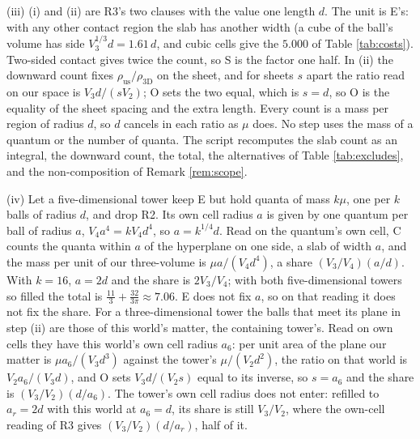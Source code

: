 (iii) (i) and (ii) are R3's two clauses with the value one length $d$. The unit is E's: with any other contact region the slab has another width (a cube of the ball's volume has side $V_{3}^{1/3}d = 1.61\,d$, and cubic cells give the $5.000$ of Table \ref{tab:costs}). Two-sided contact gives twice the count, so S is the factor one half. In (ii) the downward count fixes $\rho_{\mathrm{us}}/\rho_{3\mathrm{D}}$ on the sheet, and for sheets $s$ apart the ratio read on our space is $V_{3}d/(sV_{2})$; O sets the two equal, which is $s = d$, so O is the equality of the sheet spacing and the extra length. Every count is a mass per region of radius $d$, so $d$ cancels in each ratio as $\mu$ does. No step uses the mass of a quantum or the number of quanta. The script recomputes the slab count as an integral, the downward count, the total, the alternatives of Table \ref{tab:excludes}, and the non-composition of Remark \ref{rem:scope}.

(iv) Let a five-dimensional tower keep E but hold quanta of mass $k\mu$, one per $k$ balls of radius $d$, and drop R2. Its own cell radius $a$ is given by one quantum per ball of radius $a$, $V_{4}a^{4} = kV_{4}d^{4}$, so $a = k^{1/4}d$. Read on the quantum's own cell, C counts the quanta within $a$ of the hyperplane on one side, a slab of width $a$, and the mass per unit of our three-volume is $\mu a/(V_{4}d^{4})$, a share $(V_{3}/V_{4})(a/d)$. With $k = 16$, $a = 2d$ and the share is $2V_{3}/V_{4}$; with both five-dimensional towers so filled the total is $\tfrac{11}{3} + \tfrac{32}{3\pi} \approx 7.06$. E does not fix $a$, so on that reading it does not fix the share. For a three-dimensional tower the balls that meet its plane in step (ii) are those of this world's matter, the containing tower's. Read on own cells they have this world's own cell radius $a_{6}$: per unit area of the plane our matter is $\mu a_{6}/(V_{3}d^{3})$ against the tower's $\mu/(V_{2}d^{2})$, the ratio on that world is $V_{2}a_{6}/(V_{3}d)$, and O sets $V_{3}d/(V_{2}s)$ equal to its inverse, so $s = a_{6}$ and the share is $(V_{3}/V_{2})(d/a_{6})$. The tower's own cell radius does not enter: refilled to $a_{r} = 2d$ with this world at $a_{6} = d$, its share is still $V_{3}/V_{2}$, where the own-cell reading of R3 gives $(V_{3}/V_{2})(d/a_{r})$, half of it.
